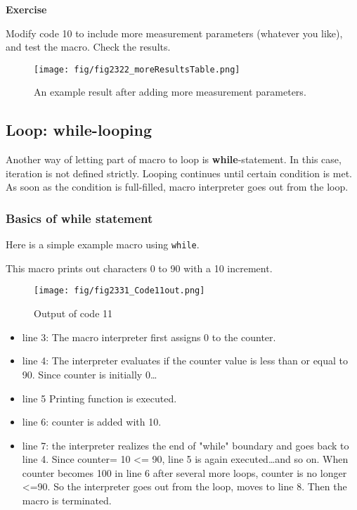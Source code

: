 \documentclass[11pt,a4paper,oneside]{report}
\newenvironment{indentexercise}[1]%
{{\setlength{\leftmargin}{2em}}%
\textbf{Exercise \thesubsection-#1}%
\begin{list}{}%
	\item%
}
{\end{list}}
\newcommand{\ilcom}[1]{\texttt{\small#1}}
\begin{document}
\begin{indentexercise}{1}
Modify code 10 to include more measurement parameters (whatever you like), and test the macro. Check the results. 
\end{indentexercise}

\begin{figure}[htbp]
\begin{center}
\texttt{[image: fig/fig2322\_moreResultsTable.png]}
\caption{An example result after adding more measurement parameters.}
\label{fig_MoreMeasurementPara}
\end{center}
\end{figure} 

\subsection{Loop: while-looping}

Another way of letting part of macro to loop is \textbf{while}-statement. In this case, iteration is not defined strictly. Looping continues until certain condition is met. As soon as the condition is full-filled, macro interpreter goes out from the loop.

\subsubsection{Basics of while statement}
Here is a simple example macro using \ilcom{while}.

This macro prints out characters 0 to 90 with a 10 increment. 

\begin{figure}[htbp]
\begin{center}
\texttt{[image: fig/fig2331\_Code11out.png]}
\caption{Output of code 11}
\label{fig:code11 output}
\end{center}
\end{figure} 

\begin{itemize}
\item line 3: The macro interpreter first assigns 0 to the counter.
\item line 4: The interpreter evaluates if the counter value is less than or equal to 90. Since counter is initially 0\ldots 
\item line 5 Printing function is executed. 
\item line 6: counter is added with 10. 
\item line 7: the interpreter realizes the end of "while" boundary and goes back to line 4. Since counter= 10 <= 90, line 5 is again executed\ldots and so on. When counter becomes 100 in line 6 after several more loops, counter is no longer <=90. So the interpreter goes out from the loop, moves to line 8. Then the macro is terminated.
\end{itemize}
\end{document}
